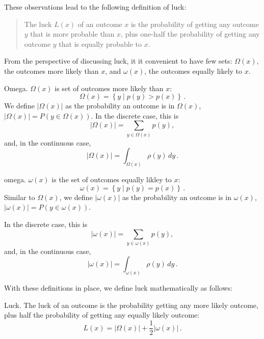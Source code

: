 These observations lead to the following definition of luck:
\begin{quote}
The luck $L(x)$ of an outcome $x$ is the probability of getting any outcome $y$ that is more probable than $x$, plus one-half the probability of getting any outcome $y$ that is equally probable to $x$.
\end{quote}

From the perspective of discussing luck, it it convenient to have few sets: $\Omega(x)$, the outcomes more likely than $x$, and $\omega(x)$, the outcomes equally likely to $x$.

\begin{definition}{Omega.}  $\Omega(x)$ is set of outcomes more likely than $x$:
\begin{equation}
\Omega(x) = \left\{ y \mid p(y)>p(x) \right\} \,.
\end{equation}
We define $|\Omega(x)|$ as the probability an outcome is in $\Omega(x)$,
$|\Omega(x)| = P(y\in\Omega(x))$.  In the discrete case, this is
\begin{equation}
|\Omega(x)| = \sum_{y \in \Omega(x)} p(y),
\end{equation}
and, in the continuous case,
\begin{equation}
|\Omega(x)| = \int_{\Omega(x)} \rho(y)\,dy \,.
\end{equation}
\end{definition}

\begin{definition}{omega.}
$\omega(x)$ is the set of outcomes equally likley to $x$:
\begin{equation}
\omega(x) = \left\{ y \mid p(y)=p(x) \right\} \,.
\end{equation}
Similar to $\Omega(x)$, we define $|\omega(x)|$ as the probability an outcome is in $\omega(x)$,
$|\omega(x)| = P(y\in\omega(x))$.  

In the discrete case, this is
\begin{equation}
|\omega(x)| = \sum_{y \in \omega(x)} p(y),
\end{equation}
and, in the continuous case,
\begin{equation}
|\omega(x)| = \int_{\omega(x)} \rho(y)\,dy \,.
\end{equation}
\end{definition}

With these definitions in place, we define luck mathematically as follows:
\begin{definition}{Luck.}  The luck of an outcome is the probability getting any more likely outcome, plus half the probability of getting any equally likely outcome:
\begin{equation}
L(x)=|\Omega(x)| + \frac{1}{2} |\omega(x)| \,.
\end{equation}
\end{definition}


